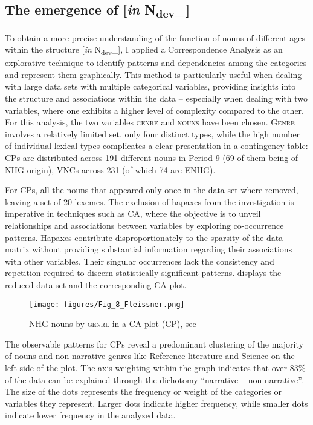 \documentclass[output=paper,colorlinks,citecolor=brown]{langscibook}
\begin{document}
\subsection{The emergence of [\textit{in} N\textsubscript{dev}\_]}\label{sec:fleissner:4.3}
To obtain a more precise understanding of the function of nouns of different ages within the structure [\textit{in} N\textsubscript{dev}\_], I applied a Correspondence Analysis \citep{Glynn2014} as an explorative technique to identify patterns and dependencies among the categories and represent them graphically. This method is particularly useful when dealing with large data sets with multiple categorical variables, providing insights into the structure and associations within the data – especially when dealing with two variables, where one exhibits a higher level of complexity compared to the other. For this analysis, the two variables \textsc{genre} and \textsc{nouns} have been chosen. \textsc{Genre} involves a relatively limited set, only four distinct  types, while the high number of individual lexical types complicates a clear presentation in a contingency table: CPs are distributed across 191 different nouns in Period 9 (69 of them being of NHG origin), VNCs across 231 (of which 74 are ENHG). 

For CPs, all the nouns that appeared only once in the data set where removed, leaving a set of 20 lexemes. The exclusion of hapaxes from the investigation is imperative in techniques such as CA, where the objective is to unveil relationships and associations between variables by exploring co-occurrence patterns. Hapaxes contribute disproportionately to the sparsity of the data matrix without providing substantial information regarding their associations with other variables. Their singular occurrences lack the consistency and repetition required to discern statistically significant patterns.  displays the reduced data set and the corresponding CA plot.    

 \begin{figure}
     \centering
     \texttt{[image: figures/Fig\_8\_Fleissner.png]}
     \caption{NHG nouns by \textsc{genre} \textup{in a CA plot (CP)}, see }
     \label{fig:fleissner:6}
 \end{figure}

The observable patterns for CPs reveal a predominant clustering of the majority of nouns and non-narrative genres like Reference literature and Science on the left side of the plot. The axis weighting within the graph indicates that over 83\% of the data can be explained through the  dichotomy ``narrative – non-narrative''. The size of the dots represents the frequency or weight of the categories or variables they represent. Larger dots indicate higher frequency, while smaller dots indicate lower frequency in the analyzed data.
\end{document}
